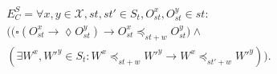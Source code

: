 \documentclass[journal,compsoc]{IEEEtran}
\begin{document}
    \begin{align}\label{eqn:PC}
\begin{split}
E^S_C =  \forall x,y \in \mathcal{X}, \mathit{st},\mathit{st}' \in \mathit{S_t}, O_\mathit{st}^x, O_\mathit{st}^{y} \in \mathit{st}:  \\
\big( \big( \square \left( O_\mathit{st}^x \rightarrow \lozenge O_\mathit{st}^{y} \right)
 \rightarrow O_\mathit{st}^x \preccurlyeq_{\mathit{st}+w} O_\mathit{st}^{y} \big) \wedge \\
\left( \exists W^x, W'^{y} \in \mathit{S_t}: W^x \preccurlyeq_{\mathit{st}+w} W'^{y} \rightarrow W^x \preccurlyeq_{\mathit{st'}+w} W'^{y} \right) \big).
\end{split}
  \end{align}
\end{document}
